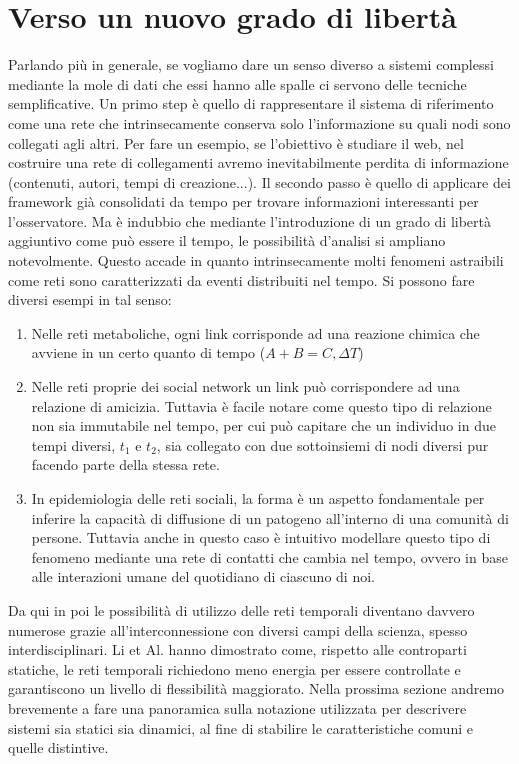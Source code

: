 \documentclass[12pt,twoside]{report}
\begin{document}
	\section{Verso un nuovo grado di libertà}
	Parlando più in generale, se vogliamo dare un senso diverso a sistemi complessi mediante la mole di dati che essi hanno alle spalle ci servono delle tecniche semplificative. Un primo step è quello di rappresentare il sistema di riferimento come una rete che intrinsecamente conserva solo l'informazione su quali nodi sono collegati agli altri. Per fare un esempio, se l'obiettivo è studiare il web, nel costruire una rete di collegamenti avremo inevitabilmente perdita di informazione (contenuti, autori, tempi di creazione...). Il secondo passo è quello di applicare dei framework già consolidati da tempo per trovare informazioni interessanti per l'osservatore.
	Ma è indubbio che mediante l'introduzione di un grado di libertà aggiuntivo come può essere il tempo, le possibilità d'analisi si ampliano notevolmente.
	Questo accade in quanto intrinsecamente molti fenomeni astraibili come reti sono caratterizzati da eventi distribuiti nel tempo. Si possono fare diversi esempi in tal senso:
	\begin{enumerate}
	    \item Nelle reti metaboliche, ogni link corrisponde ad una reazione chimica che avviene in un certo quanto di tempo ($A+B = C, \Delta T$)
	    \item Nelle reti proprie dei social network un link può corrispondere ad una relazione di amicizia. Tuttavia è facile notare come questo tipo di relazione non sia immutabile nel tempo, per cui può capitare che un individuo in due tempi diversi, $t_1$ e $t_2$, sia collegato con due sottoinsiemi di nodi diversi pur facendo parte della stessa rete.
	    \item In epidemiologia delle reti sociali, la forma è un aspetto fondamentale per inferire la capacità di diffusione di un patogeno all'interno di una comunità di persone. Tuttavia anche in questo caso è intuitivo modellare questo tipo di fenomeno mediante una rete di contatti che cambia nel tempo, ovvero in base alle interazioni umane del quotidiano di ciascuno di noi. 
	\end{enumerate}
	Da qui in poi le possibilità di utilizzo delle reti temporali diventano davvero numerose grazie all'interconnessione con diversi campi della scienza, spesso interdisciplinari. Li et Al.\cite{doi:10.1126/science.aai7488} hanno dimostrato come, rispetto alle controparti statiche, le reti temporali richiedono meno energia per essere controllate e garantiscono un livello di flessibilità maggiorato. Nella prossima sezione andremo brevemente a fare una panoramica sulla notazione utilizzata per descrivere sistemi sia statici sia dinamici, al fine di stabilire le caratteristiche comuni e quelle distintive.
\end{document}
